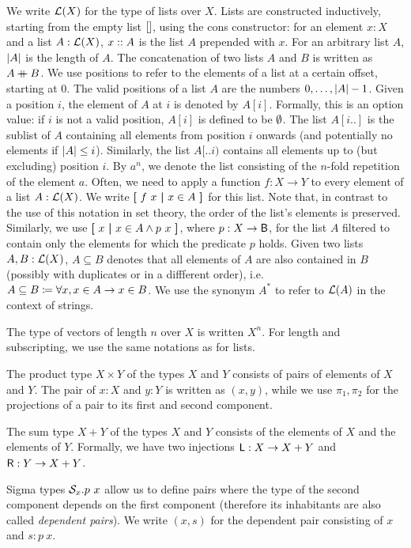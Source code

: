 We write $\mathcal{L} (X)$ for the type of lists over $X$. Lists are constructed inductively, starting from the empty list $[]$, using the cons constructor: for an element $x : X$ and a list $A : \mathcal{L} (X)$, $x::{} A$ is the list $A$ prepended with $x$.
For an arbitrary list $A$, $|A|$ is the length of $A$. 
The concatenation of two lists $A$ and $B$ is written as $A \mathbin{+\mkern-10mu+}{} B$. 
We use positions to refer to the elements of a list at a certain offset, starting at 0. The valid positions of a list $A$ are the numbers $0, \ldots, |A|-1$. 
Given a position $i$, the element of $A$ at $i$ is denoted by $A[i]$. Formally, this is an option value: if $i$ is not a valid position, $A[i]$ is defined to be $\emptyset{}$. 
The list $A[i..]$ is the sublist of $A$ containing all elements from position $i$ onwards (and potentially no elements if $|A| \le i$). Similarly, the list $A[..i)$ contains all elements up to (but excluding) position $i$. 
By $a^n$, we denote the list consisting of the $n$-fold repetition of the element $a$.
Often, we need to apply a function $f : X \rightarrow Y$ to every element of a list $A : \mathcal{L} (X)$. We write $\textbf{[}~ f~x ~\textbf{|}~ x \in A ~\textbf{]}$ for this list. Note that, in contrast to the use of this notation in set theory, the order of the list's elements is preserved. 
Similarly, we use $\textbf{[}~ x ~\textbf{|}~ x \in A \land p~x ~\textbf{]}$, where $p : X \rightarrow \textsf{B}$, for the list $A$ filtered to contain only the elements for which the predicate $p$ holds.
Given two lists $A, B : \mathcal{L} (X)$, $A \subseteq B$ denotes that all elements of $A$ are also contained in $B$ (possibly with duplicates or in a diffferent order), i.e.\ $A \subseteq B \coloneqq \forall x, x \in A \rightarrow x \in B$. 
We use the synonym $A^*$ to refer to $\mathcal{L} (A)$ in the context of strings.

The type of vectors of length $n$ over $X$ is written $X^n$. For length and subscripting, we use the same notations as for lists.

The product type $X \times Y$ of the types $X$ and $Y$ consists of pairs of elements of $X$ and $Y$. The pair of $x : X$ and $y : Y$ is written as $(x, y)$, while we use $\pi_1, \pi_2$ for the projections of a pair to its first and second component. 

The sum type $X + Y$ of the types $X$ and $Y$ consists of the elements of $X$ and the elements of $Y$. Formally, we have two injections $\textsf{L} : X \rightarrow X + Y$ and $\textsf{R} : Y \rightarrow X + Y$. 

Sigma types $\mathcal{S}_{x}.p~x$ allow us to define pairs where the type of the second component depends on the first component (therefore its inhabitants are also called \emph{dependent pairs}). We write $(x, s)$ for the dependent pair consisting of $x$ and $s : p~x$. 

